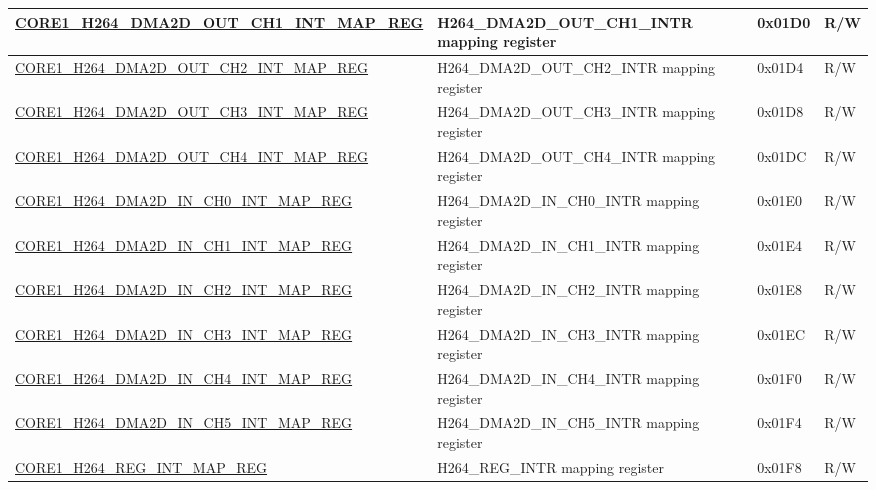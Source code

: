 \begin{longtable}{ | p{7.5cm} | p{7.2cm} | p{1.3cm} | p{1cm} | }
\hyperref[regdesc:CORE1H264DMA2DOUTCH1INTMAPREG]{CORE1\_H264\_DMA2D\_OUT\_CH1\_INT\_MAP\_REG} & H264\_DMA2D\_OUT\_CH1\_INTR mapping register & 0x01D0 & R/W \\ \hline

\hyperref[regdesc:CORE1H264DMA2DOUTCH2INTMAPREG]{CORE1\_H264\_DMA2D\_OUT\_CH2\_INT\_MAP\_REG} & H264\_DMA2D\_OUT\_CH2\_INTR mapping register & 0x01D4 & R/W \\ \hline

\hyperref[regdesc:CORE1H264DMA2DOUTCH3INTMAPREG]{CORE1\_H264\_DMA2D\_OUT\_CH3\_INT\_MAP\_REG} & H264\_DMA2D\_OUT\_CH3\_INTR mapping register & 0x01D8 & R/W \\ \hline

\hyperref[regdesc:CORE1H264DMA2DOUTCH4INTMAPREG]{CORE1\_H264\_DMA2D\_OUT\_CH4\_INT\_MAP\_REG} & H264\_DMA2D\_OUT\_CH4\_INTR mapping register & 0x01DC & R/W \\ \hline

\hyperref[regdesc:CORE1H264DMA2DINCH0INTMAPREG]{CORE1\_H264\_DMA2D\_IN\_CH0\_INT\_MAP\_REG} & H264\_DMA2D\_IN\_CH0\_INTR mapping register & 0x01E0 & R/W \\ \hline

\hyperref[regdesc:CORE1H264DMA2DINCH1INTMAPREG]{CORE1\_H264\_DMA2D\_IN\_CH1\_INT\_MAP\_REG} & H264\_DMA2D\_IN\_CH1\_INTR mapping register & 0x01E4 & R/W \\ \hline

\hyperref[regdesc:CORE1H264DMA2DINCH2INTMAPREG]{CORE1\_H264\_DMA2D\_IN\_CH2\_INT\_MAP\_REG} & H264\_DMA2D\_IN\_CH2\_INTR mapping register & 0x01E8 & R/W \\ \hline

\hyperref[regdesc:CORE1H264DMA2DINCH3INTMAPREG]{CORE1\_H264\_DMA2D\_IN\_CH3\_INT\_MAP\_REG} & H264\_DMA2D\_IN\_CH3\_INTR mapping register & 0x01EC & R/W \\ \hline

\hyperref[regdesc:CORE1H264DMA2DINCH4INTMAPREG]{CORE1\_H264\_DMA2D\_IN\_CH4\_INT\_MAP\_REG} & H264\_DMA2D\_IN\_CH4\_INTR mapping register & 0x01F0 & R/W \\ \hline

\hyperref[regdesc:CORE1H264DMA2DINCH5INTMAPREG]{CORE1\_H264\_DMA2D\_IN\_CH5\_INT\_MAP\_REG} & H264\_DMA2D\_IN\_CH5\_INTR mapping register & 0x01F4 & R/W \\ \hline

\hyperref[regdesc:CORE1H264REGINTMAPREG]{CORE1\_H264\_REG\_INT\_MAP\_REG} & H264\_REG\_INTR mapping register & 0x01F8 & R/W \\ \hline


\end{longtable}
